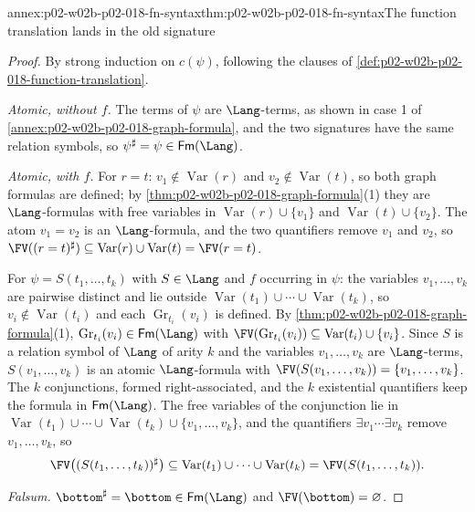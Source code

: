 \begin{annexitem}{annex:p02-w02b-p02-018-fn-syntax}{thm:p02-w02b-p02-018-fn-syntax}{The function translation lands in the old signature}
\begin{proof}
By strong induction on \(c(\psi)\), following the clauses of
\cref{def:p02-w02b-p02-018-function-translation}.

\emph{Atomic, without \(f\).}  The terms of \(\psi\) are
\(\Lang\)-terms, as shown in case 1 of
\cref{annex:p02-w02b-p02-018-graph-formula}, and the two signatures have
the same relation symbols, so
\(\psi^{\sharp}=\psi\in\mathsf{Fm}(\Lang)\).

\emph{Atomic, with \(f\).}  For \(r=t\): \(v_1\notin\operatorname{Var}(r)\)
and \(v_2\notin\operatorname{Var}(t)\), so both graph formulas are defined;
by \cref{thm:p02-w02b-p02-018-graph-formula}(1) they are \(\Lang\)-formulas
with free variables in \(\operatorname{Var}(r)\cup\{v_1\}\) and
\(\operatorname{Var}(t)\cup\{v_2\}\).  The atom \(v_1=v_2\) is an
\(\Lang\)-formula, and the two quantifiers remove \(v_1\) and \(v_2\), so
\(\FV((r=t)^{\sharp})\subseteq\operatorname{Var}(r)\cup\operatorname{Var}(t)
=\FV(r=t)\).

For \(\psi=S(t_1,\ldots,t_k)\) with \(S\in\Lang\) and \(f\) occurring in
\(\psi\): the variables \(v_1,\ldots,v_k\) are pairwise distinct and lie
outside \(\operatorname{Var}(t_1)\cup\cdots\cup\operatorname{Var}(t_k)\), so
\(v_i\notin\operatorname{Var}(t_i)\) and each \(\operatorname{Gr}_{t_i}(v_i)\)
is defined.  By \cref{thm:p02-w02b-p02-018-graph-formula}(1),
\(\operatorname{Gr}_{t_i}(v_i)\in\mathsf{Fm}(\Lang)\) with
\(\FV(\operatorname{Gr}_{t_i}(v_i))\subseteq\operatorname{Var}(t_i)\cup\{v_i\}\).
Since \(S\) is a relation symbol of \(\Lang\) of arity \(k\) and the
variables \(v_1,\ldots,v_k\) are \(\Lang\)-terms, \(S(v_1,\ldots,v_k)\) is an
atomic \(\Lang\)-formula with \(\FV(S(v_1,\ldots,v_k))=\{v_1,\ldots,v_k\}\).
The \(k\) conjunctions, formed right-associated, and the \(k\) existential
quantifiers keep the formula in \(\mathsf{Fm}(\Lang)\).  The free variables
of the conjunction lie in
\(\operatorname{Var}(t_1)\cup\cdots\cup\operatorname{Var}(t_k)
\cup\{v_1,\ldots,v_k\}\), and the quantifiers
\(\exists v_1\cdots\exists v_k\) remove \(v_1,\ldots,v_k\), so
\[
 \FV\bigl((S(t_1,\ldots,t_k))^{\sharp}\bigr)
 \subseteq\operatorname{Var}(t_1)\cup\cdots\cup\operatorname{Var}(t_k)
 =\FV(S(t_1,\ldots,t_k)).
\]

\emph{Falsum.}  \(\bottom^{\sharp}=\bottom\in\mathsf{Fm}(\Lang)\) and
\(\FV(\bottom)=\varnothing\).


\end{proof}
\end{annexitem}
